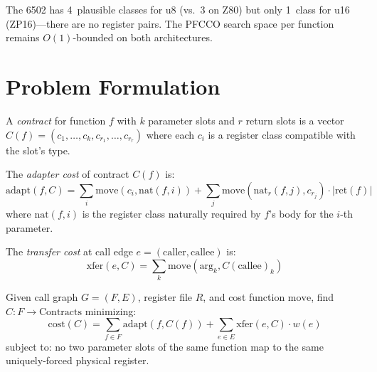 \documentclass[sigplan,screen,nonacm]{acmart}
\begin{document}
\noindent The 6502 has 4~plausible classes for u8 (vs.\ 3 on Z80) but only
1~class for u16 (\textsc{ZP16})---there are no register pairs.  The PFCCO
search space per function remains $O(1)$-bounded on both architectures.

\section{Problem Formulation}
\label{sec:formulation}

\begin{definition}[Contract]
A \emph{contract} for function $f$ with $k$ parameter slots and $r$ return
slots is a vector $C(f) = (c_1, \ldots, c_k, c_{r_1}, \ldots, c_{r_r})$
where each $c_i$ is a register class compatible with the slot's type.
\end{definition}

\begin{definition}
The \emph{adapter cost} of contract $C(f)$ is:
\begin{equation}
\text{adapt}(f, C) = \sum_{i} \text{move}(c_i, \text{nat}(f,i))
  + \sum_{j} \text{move}(\text{nat}_r(f,j), c_{r_j}) \cdot |\text{ret}(f)|
\end{equation}
where $\text{nat}(f,i)$ is the register class naturally required by $f$'s
body for the $i$-th parameter.
\end{definition}

\begin{definition}
The \emph{transfer cost} at call edge $e = (\text{caller}, \text{callee})$
is:
\begin{equation}
\text{xfer}(e, C) = \sum_{k} \text{move}(\text{arg}_k, C(\text{callee})_k)
\end{equation}
\end{definition}

\begin{definition}[PFCCO]
Given call graph $G=(F,E)$, register file $R$, and cost function
$\text{move}$, find $C: F \to \text{Contracts}$ minimizing:
\begin{equation}
\text{cost}(C) = \sum_{f \in F} \text{adapt}(f, C(f))
  + \sum_{e \in E} \text{xfer}(e, C) \cdot w(e)
\label{eq:total-cost}
\end{equation}
subject to: no two parameter slots of the same function map to the same
uniquely-forced physical register.
\end{definition}
\end{document}
